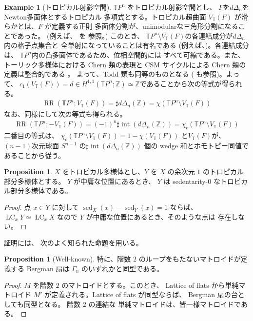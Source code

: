 \documentclass[a4paper,dvipdfmx,reqno,12pt]{amsart}
\theoremstyle{definition}
\newtheorem{example}[theorem]{Example}
\newtheorem{proposition}[theorem]{Proposition}
\newcommand{\opn}[1]{\operatorname{#1}}
\numberwithin{equation}{section}
\begin{document}
\begin{example}[{トロピカル射影空間}]
\label{example-TPn}
$\mathbb{T}P^{n}$ をトロピカル射影空間とし、
$F$を$d\Delta_{n}$をNewton多面体とするトロピカル
多項式とする。トロピカル超曲面 
$V_{\mathbb{T}}(F)$ が滑らかとは、$F$ が定義する正則
多面体分割が、unimodularな三角形分割になることであった。
(例えば、\cite[]{MR3287221} を
参照。)
このとき、
$\mathbb{T}P^{n}\setminus
V_{\mathbb{T}}(F)$の各連結成分が$d\Delta_n$内の格子点集合と
全単射になっていることは有名である
(例えば、\cite[Proposition 3.1.6]{MR3287221})。各連結成分は、
$\mathbb{T}P^{n}$内の凸多面体であるため、位相空間的には
すべて可縮である。また、
トーリック多様体における Chern 類の表現と
CSM サイクルによる Chern 類の定義は整合的である
\cite[Proposition 13.1.2]{MR2810322}。
よって、Todd 類も同等のものとなる
(\cite[Theorem 13.1.6]{MR2810322} も参照)。よって、
$c_1(V_{\mathbb{T}}(F))=d\in H^{1,1}(\mathbb{T}P^{n};
\mathbb{Z})
\simeq \mathbb{Z}$であることから次の等式が得られる。
\begin{align}
\opn{RR}(\mathbb{T}P^{n};V_{\mathbb{T}}(F))=
\sharp d\Delta_n(\mathbb{Z})=
\chi(\mathbb{T}P^{n}\setminus
V_{\mathbb{T}}(F))
\end{align}
なお、同様にして次の等式も得られる。
\begin{align}
\opn{RR}(\mathbb{T}P^{n};-V_{\mathbb{T}}(F))=
(-1)^{n}\sharp \opn{int}(d\Delta_n(\mathbb{Z}))=
\chi_{c}(\mathbb{T}P^{n}\setminus
V_{\mathbb{T}}(F))   
\end{align}
二番目の等式は、
$\chi_{c}(\mathbb{T}P^{n}\setminus
V_{\mathbb{T}}(F))=1-\chi (V_{\mathbb{T}}(F))$
と$V_{\mathbb{T}}(F)$が、$(n-1)$次元球面
$S^{n-1}$ 
の$\sharp \opn{int}(d\Delta_n(\mathbb{Z}))$
個の wedge 和とホモトピー同値であることから従う。
\end{example}

\begin{proposition}
$X$ をトロピカル多様体とし、$Y$ を
$X$ の余次元 $1$
のトロピカル部分多様体とする。
$Y$ が中庸な位置にあるとき、
$Y$ は sedentarity-0 なトロピカル部分多様体である。
\end{proposition}
\begin{proof}
点 $x\in Y$ に対して
$\opn{sed}_X(x)-\opn{sed}_Y(x)=1$ ならば、
$\opn{LC}_xY\simeq \opn{LC}_x X$ なので
$Y$ が中庸な位置にあるとき、そのような点は
存在しない。
\end{proof}

証明には、
次のよく知られた命題を用いる。
\begin{proposition}[{Well-known}]


特に、階数 $2$ のループをもたないマトロイドが定義する
Bergman 扇は $\Gamma_n$ のいずれかと同型である。
\end{proposition}
\begin{proof}
$M$ を階数 $2$ のマトロイドとする。このとき、
Lattice of flats から単純マトロイド
$M'$ が定義される。Lattice of flats が同型ならば、
Bergman 扇の台としても同型となる。
階数 $2$ の連結な
単純マトロイドは、皆一様マトロイドである。
\end{proof}
\end{document}
